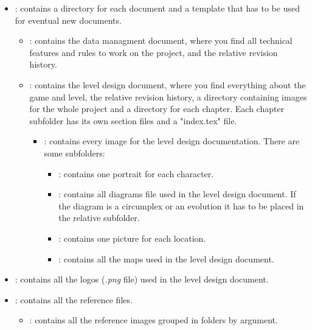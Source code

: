 \documentclass[12pt]{article}
\begin{document}
\begin{itemize}
\item \textbf{}: contains a directory for each document and a template that has to be used for eventual new documents.
  \begin{itemize}
    \item \textbf{}: contains the data managment document, where you find all technical features and rules to work on the project, and the relative revision history.

    \item \textbf{}: contains the level design document, where you find everything about the game and level, the relative revision history, a directory containing images for the whole project and a directory for each chapter. Each chapter subfolder has its own section files and a "index.tex" file.
    \begin{itemize}
    \item \textbf{}: contains every image for the level design documentation. There are some subfolders:
    \begin{itemize}
      \item \textbf{}: contains one portrait for each character.
      \item \textbf{}: contains all diagrams file used in the level design document. If the diagram is a circumplex or an evolution it has to be placed in the relative subfolder.
        \item \textbf{}: contains one picture for each location.
        \item \textbf{}: contains all the maps used in the level design document.
    \end{itemize}
\end{itemize}
\end{itemize}
    \item \textbf{}: contains all the logos (\textit{.png} file) used in the level design document.

    \item \textbf{}: contains all the reference files.
      \begin{itemize}
        \item \textbf{}: contains all the reference images grouped in folders by argument.
        \end{itemize}
\end{itemize}
\end{document}
